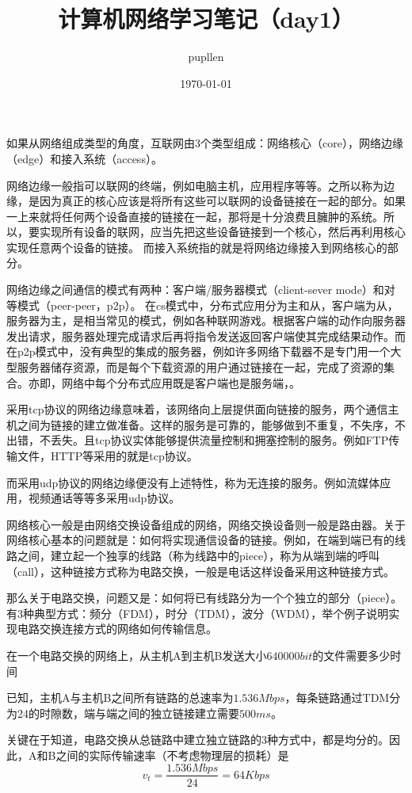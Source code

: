 \documentclass[fontset=windows]{article}
\title{\heiti\zihao{2} 计算机网络学习笔记（day1）}
\author{\songti pupllen}
\date{\today}
\begin{document}
	\maketitle
	如果从网络组成类型的角度，互联网由3个类型组成：网络核心（core），网络边缘（edge）和接入系统（access）。

	网络边缘一般指可以联网的终端，例如电脑主机，应用程序等等。之所以称为边缘，是因为真正的核心应该是将所有这些可以联网的设备链接在一起的部分。如果一上来就将任何两个设备直接的链接在一起，那将是十分浪费且臃肿的系统。所以，要实现所有设备的联网，应当先把这些设备链接到一个核心，然后再利用核心实现任意两个设备的链接。
	而接入系统指的就是将网络边缘接入到网络核心的部分。

	网络边缘之间通信的模式有两种：客户端/服务器模式（client-sever mode）和对等模式（peer-peer，p2p）。
	在cs模式中，分布式应用分为主和从，客户端为从，服务器为主，是相当常见的模式，例如各种联网游戏。根据客户端的动作向服务器发出请求，服务器处理完成请求后再将指令发送返回客户端使其完成结果动作。而在p2p模式中，没有典型的集成的服务器，例如许多网络下载器不是专门用一个大型服务器储存资源，而是每个下载资源的用户通过链接在一起，完成了资源的集合。亦即，网络中每个分布式应用既是客户端也是服务端，。

	采用tcp协议的网络边缘意味着，该网络向上层提供面向链接的服务，两个通信主机之间为链接的建立做准备。这样的服务是可靠的，能够做到不重复，不失序，不出错，不丢失。且tcp协议实体能够提供流量控制和拥塞控制的服务。例如FTP传输文件，HTTP等采用的就是tcp协议。

	而采用udp协议的网络边缘便没有上述特性，称为无连接的服务。例如流媒体应用，视频通话等等多采用udp协议。

	网络核心一般是由网络交换设备组成的网络，网络交换设备则一般是路由器。关于网络核心基本的问题就是：如何将实现通信设备的链接。例如，在端到端已有的线路之间，建立起一个独享的线路（称为线路中的piece），称为从端到端的呼叫（call），这种链接方式称为电路交换，一般是电话这样设备采用这种链接方式。

	那么关于电路交换，问题又是：如何将已有线路分为一个个独立的部分（piece）。有3种典型方式：频分（FDM），时分（TDM），波分（WDM），举个例子说明实现电路交换连接方式的网络如何传输信息。

	在一个电路交换的网络上，从主机A到主机B发送大小$640000 bit$的文件需要多少时间
	
	已知，主机A与主机B之间所有链路的总速率为$1.536Mbps$，每条链路通过TDM分为24的时隙数，端与端之间的独立链接建立需要$500ms$。

	关键在于知道，电路交换从总链路中建立独立链路的3种方式中，都是均分的。因此，A和B之间的实际传输速率（不考虑物理层的损耗）是
	\begin{equation}
		v_{t} = \frac{1.536Mbps}{24} = 64Kbps 
	\end{equation}
\end{document}
